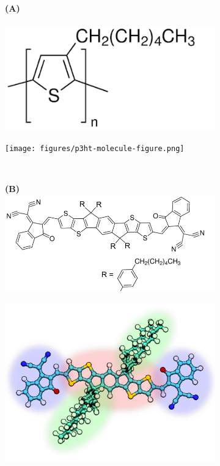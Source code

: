 \begin{figure}
\centering
\begin{subfigure}{.2\textwidth}
    \textbf{(A)}  \\
    \centering
    \\
    \includegraphics[width=\textwidth]{figures/p3ht-monomer-structure.png}
\end{subfigure}%
\begin{subfigure}{.5\textwidth}
    \texttt{[image: figures/p3ht-molecule-figure.png]}
\end{subfigure}
\\
\begin{subfigure}{.3\textwidth}
    \textbf{(B)} 
    \centering
    \\
    \includegraphics[width=\textwidth]{figures/itic-molecule-structure.png}
\end{subfigure}
\begin{subfigure}{.3\textwidth}
    \includegraphics[width=\textwidth]{figures/itic-backbone-figure.png}

\end{subfigure}
\end{figure}
